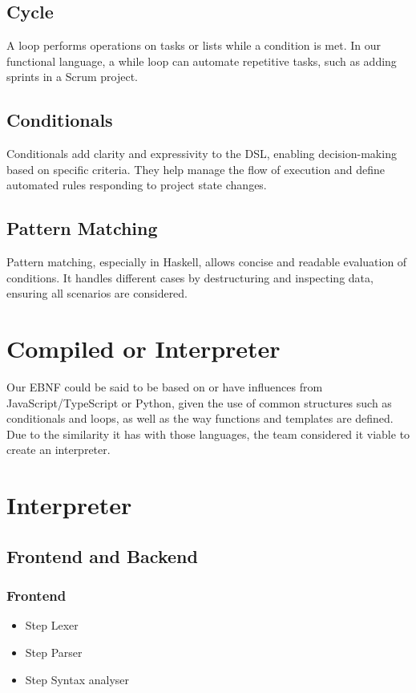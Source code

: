 \documentclass{article}
\begin{document}
\subsection{Cycle}
\label{sec:cycle}
A loop performs operations on tasks or lists while a condition is met. In our functional language, a while loop can automate repetitive tasks, such as adding sprints in a Scrum project.

\subsection{Conditionals}
\label{sec:conditionals}
Conditionals add clarity and expressivity to the DSL, enabling decision-making based on specific criteria. They help manage the flow of execution and define automated rules responding to project state changes.

\subsection{Pattern Matching}
\label{sec:pattern-matching}
Pattern matching, especially in Haskell, allows concise and readable evaluation of conditions. It handles different cases by destructuring and inspecting data, ensuring all scenarios are considered.

\section{Compiled or Interpreter}
\label{sec:compiled-or-interpreter}
Our EBNF could be said to be based on or have influences from JavaScript/TypeScript or Python, given the use of common structures such as conditionals and loops, as well as the way functions and templates are defined. \\

Due to the similarity it has with those languages, the team considered it viable to create an interpreter.

\section{Interpreter}
\label{sec:interpreter}

\subsection{Frontend and Backend}
\label{sec:frontend_backend}

\subsubsection{Frontend}
\begin{itemize}
    \item Step Lexer
    \item Step Parser
    \item Step Syntax analyser
\end{itemize}
\end{document}
